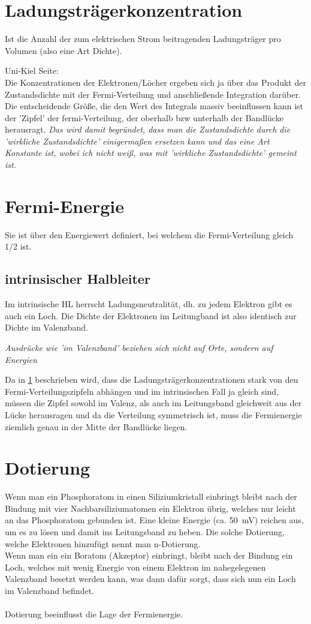 \documentclass[paper=a4,10pt]{scrartcl}
\begin{document}
\section{Ladungsträgerkonzentration}
\label{sec:carrier_concentration}
Ist die Anzahl der zum elektrischen Strom beitragenden Ladungsträger pro Volumen (also eine Art Dichte).

Uni-Kiel Seite:\\
Die Konzentrationen der Elektronen/Löcher ergeben sich ja über das Produkt der Zustandsdichte mit der Fermi-Verteilung und anschließende Integration darüber. Die entscheidende Größe, die den Wert des Integrals massiv beeinflussen kann ist der 'Zipfel' der fermi-Verteilung, der oberhalb bzw unterhalb der Bandlücke herausragt.
\textit{Das wird damit begründet, dass man die Zustandsdichte durch die 'wirkliche Zustandsdichte' einigermaßen ersetzen kann und das eine Art Konstante ist, wobei ich nicht weiß, was mit 'wirkliche Zustandsdichte' gemeint ist.}


\section{Fermi-Energie}
Sie ist über den Energiewert definiert, bei welchem die Fermi-Verteilung gleich 1/2 ist.

\subsection{intrinsischer Halbleiter}
Im intrinsische HL herrscht Ladungsneutralität, dh. zu jedem Elektron gibt es auch ein Loch. Die Dichte der Elektronen im Leitungband ist also identisch zur Dichte im Valenzband.

\textit{Ausdrücke wie 'im Valenzband' beziehen sich nicht auf Orte, sondern auf Energien}

Da in \ref{sec:carrier_concentration} beschrieben wird, dass die Ladungsträgerkonzentrationen stark von den Fermi-Verteilungszipfeln abhängen und im intrinsischen Fall ja gleich sind, müssen die Zipfel sowohl im Valenz, als auch im Leitungsband gleichweit aus der Lücke herausragen und da die Verteilung symmetrisch ist, muss die Fermienergie ziemlich genau in der Mitte der Bandlücke liegen. 

\section{Dotierung}
Wenn man ein Phosphoratom in einen Siliziumkristall einbringt bleibt nach der Bindung mit vier Nachbarsiliziumatomen ein Elektron übrig, welches nur leicht an das Phosphoratom gebunden ist. Eine kleine Energie (ca. \SI{50}{\milli\volt}) reichen aus, um es zu lösen und damit ins Leitungsband zu heben. Die solche Dotierung, welche Elektronen hinzufügt nennt man n-Dotierung.\\
Wenn man ein ein Boratom (Akzeptor) einbringt, bleibt nach der Bindung ein Loch, welches mit wenig Energie von einem Elektron im nahegelegenen Valenzband besetzt werden kann, was dann dafür sorgt, dass sich nun ein Loch im Valenzband befindet.\\\\
Dotierung beeinflusst die Lage der Fermienergie.
\end{document}
